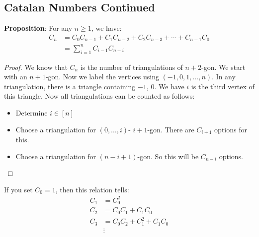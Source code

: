 \documentclass{report}
\begin{document}
\begin{topic}
    \section{Catalan Numbers Continued}
\end{topic}

\textbf{Proposition}: For any $n \geq 1$, we have:
    \begin{align*}
        C_{n} &= C_{0}C_{n - 1} + C_{1}C_{n - 2} + C_{2}C_{n - 3} + \cdots +C_{n - 1}C_{0} \\
              &= \sum_{i = 1}^{n}C_{i - 1}C_{n - i}
    \end{align*}
    \begin{proof}
        We know that $C_{n}$ is the number of triangulations of $n + 2$-gon. We start with an $n + 1$-gon. Now we label the vertices using $(-1, 0, 1, \ldots , n)$. In any triangulation, there is a triangle containing $-1$, $0$. We have $i$ is the third vertex of this triangle. Now all triangulations can be counted as follows:
            \begin{itemize}
                \item Determine $i \in [n]$

                \item Choose a triangulation for $(0, \ldots , i)$- $i + 1$-gon. There are $C_{i + 1}$ options for this.

                \item Choose a triangulation for $(n - i + 1)$-gon. So this will be $C_{n - i}$ options.
            \end{itemize}
    \end{proof}

If you set $C_{0} = 1$, then this relation tells:
    \begin{align*}
        C_{1} &=       C_{0}^{2}                           \\
        C_{2} &=       C_{0}C_{1} + C_{1}C_{0}             \\
        C_{3} &=       C_{0}C_{2} + C_{1}^{2} + C_{1}C_{0} \\
              &\vdots                                        
    \end{align*}
\end{document}
